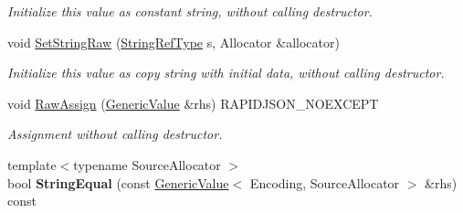 \begin{DoxyCompactItemize}
\begin{DoxyCompactList}\small\item\em Initialize this value as constant string, without calling destructor. \end{DoxyCompactList}\item 
void \hyperlink{class_generic_value_ad3d91db36dfdbfc1af40a79aae07723c}{Set\+String\+Raw} (\hyperlink{class_generic_value_a32e0f30ee278072374c8168b14d3317f}{String\+Ref\+Type} s, Allocator \&allocator)\hypertarget{class_generic_value_ad3d91db36dfdbfc1af40a79aae07723c}{}\label{class_generic_value_ad3d91db36dfdbfc1af40a79aae07723c}

\begin{DoxyCompactList}\small\item\em Initialize this value as copy string with initial data, without calling destructor. \end{DoxyCompactList}\item 
void \hyperlink{class_generic_value_abb8ea2dfbe74ff4ee7dac6be31317f81}{Raw\+Assign} (\hyperlink{class_generic_value}{Generic\+Value} \&rhs) R\+A\+P\+I\+D\+J\+S\+O\+N\+\_\+\+N\+O\+E\+X\+C\+E\+PT\hypertarget{class_generic_value_abb8ea2dfbe74ff4ee7dac6be31317f81}{}\label{class_generic_value_abb8ea2dfbe74ff4ee7dac6be31317f81}

\begin{DoxyCompactList}\small\item\em Assignment without calling destructor. \end{DoxyCompactList}\item 
{\footnotesize template$<$typename Source\+Allocator $>$ }\\bool {\bfseries String\+Equal} (const \hyperlink{class_generic_value}{Generic\+Value}$<$ Encoding, Source\+Allocator $>$ \&rhs) const \hypertarget{class_generic_value_a5ff908402687e14f5f14552ec58113a4}{}\label{class_generic_value_a5ff908402687e14f5f14552ec58113a4}

\end{DoxyCompactItemize}
